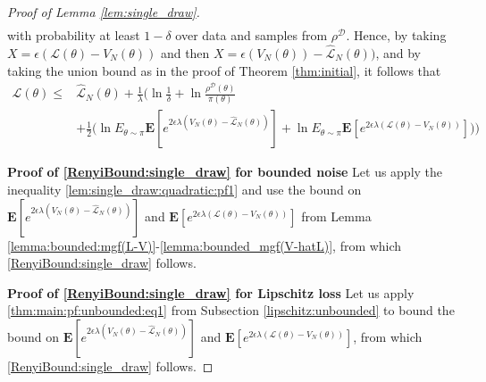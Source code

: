 \documentclass{article}
\newcommand{\train}{\mathcal{D}}
\newcommand{\bE}{\mathbf{E}}
\begin{document}
\begin{proof}[Proof of Lemma \ref{lem:single_draw}]
\begin{equation}
\begin{split}
   \end{split} 
 \end{equation}
 with probability at least $1-\delta$ over data and samples from $\rho^{\train}$.
 Hence, by taking $X=\epsilon (\mathcal{L}(\theta)-V_N(\theta))$ and then $X=\epsilon (V_N(\theta))-\hat{\mathcal{L}}_N(\theta))$, and 
 by taking the union bound as in the proof of Theorem \ref{thm:initial}, it follows that
 \begin{equation}
\label{lem:single_draw:quadratic:pf1}
 \begin{split}
  \mathcal{L}(\theta) \le & \hat{\mathcal{L}}_N(\theta) + \frac{1}{\lambda} \Big(\ln \frac{1}{\delta} +\ln \frac{\rho^{\train}(\theta)}{\pi(\theta)}  \\
  &+\frac{1}{2} \Big (\ln E_{\theta\sim\pi}\bE[e^{2\epsilon\lambda(V_N(\theta)-\hat{\mathcal{L}}_N(\theta))}]
        +\ln E_{\theta\sim\pi}\bE[e^{2\epsilon\lambda (\mathcal{L}(\theta)-V_N(\theta))}] \Big )\Big)
 \end{split}
 \end{equation}

\textbf{Proof of \eqref{RenyiBound:single_draw} for bounded noise}
 Let us  apply the  inequality \eqref{lem:single_draw:quadratic:pf1} 
 and use
 the bound on $\bE[e^{2\epsilon\lambda (V_N(\theta)-\hat{\mathcal{L}}_N(\theta))}]$ and $\bE[e^{2\epsilon\lambda (\mathcal{L}(\theta)-V_N(\theta))}]$ from
  Lemma \ref{lemma:bounded:mgf(L-V)}-\ref{lemma:bounded_mgf(V-hatL)}, from which \eqref{RenyiBound:single_draw} follows. 
  
  
\textbf{Proof of \eqref{RenyiBound:single_draw} for Lipschitz loss}
 Let us apply  \eqref{thm:main:pf:unbounded:eq1} from Subsection \ref{lipschitz:unbounded} to bound
 the bound on $\bE[e^{2\epsilon\lambda (V_N(\theta)-\hat{\mathcal{L}}_N(\theta))}]$ and $\bE[e^{2\epsilon\lambda (\mathcal{L}(\theta)-V_N(\theta))}]$, from which \eqref{RenyiBound:single_draw} follows.
   

\end{proof}
\end{document}
